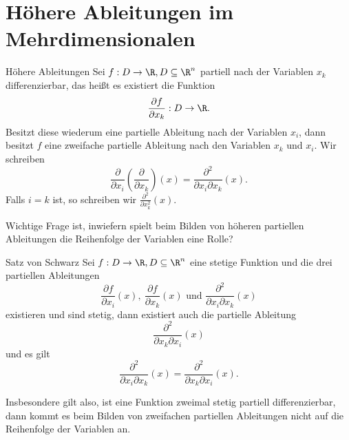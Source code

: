 \section{Höhere Ableitungen im Mehrdimensionalen}
\begin{definition}{Höhere Ableitungen}
	Sei $f:D\rightarrow\R,D\subseteq\R^n$ partiell nach der Variablen $x_k$ differenzierbar, das heißt es existiert die Funktion
	\begin{equation*}
		\frac{\partial f}{\partial x_k}:D\rightarrow \R.
	\end{equation*}
	Besitzt diese wiederum eine partielle Ableitung nach der Variablen $x_i$, dann besitzt $f$ eine zweifache partielle Ableitung nach den Variablen $x_k$ und $x_i$. Wir schreiben
	\begin{equation*}
		\frac{\partial}{\partial x_i}\left(\frac{\partial}{\partial x_k}\right)(x)=\frac{\partial^2}{\partial x_i\partial x_k}(x).
	\end{equation*}
	Falls $i=k$ ist, so schreiben wir $\frac{\partial^2}{\partial x_k^2}(x)$.
\end{definition}
Wichtige Frage ist, inwiefern spielt beim Bilden von höheren partiellen Ableitungen die Reihenfolge der Variablen eine Rolle?
\begin{satz}{Satz von Schwarz}
	Sei $f:D\rightarrow\R,D\subseteq\R^n$ eine stetige Funktion und die drei partiellen Ableitungen
	\begin{equation*}
		\frac{\partial f}{\partial x_i}(x),\ \frac{\partial f}{\partial x_k}(x) \text{ und } \frac{\partial^2}{\partial x_i\partial x_k}(x)
	\end{equation*}
	existieren und sind stetig, dann existiert auch die partielle Ableitung
	\begin{equation*}
		\frac{\partial^2}{\partial x_k\partial x_i}(x)
	\end{equation*}
	und es gilt
	\begin{equation*}
		\frac{\partial^2}{\partial x_i\partial x_k}(x)=\frac{\partial^2}{\partial x_k\partial x_i}(x).
	\end{equation*}
\end{satz}
Insbesondere gilt also, ist eine Funktion zweimal stetig partiell differenzierbar, dann kommt es beim Bilden von zweifachen partiellen Ableitungen nicht auf die Reihenfolge der Variablen an.
